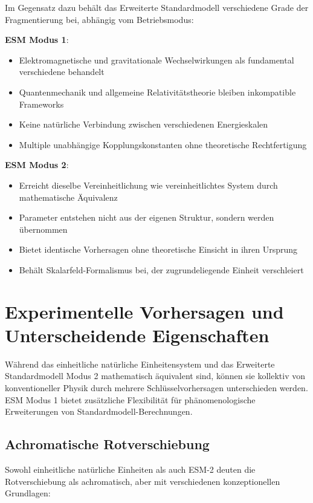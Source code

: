	Im Gegensatz dazu behält das Erweiterte Standardmodell verschiedene Grade der Fragmentierung bei, abhängig vom Betriebsmodus:
	
	\textbf{ESM Modus 1}:
	\begin{itemize}
		\item Elektromagnetische und gravitationale Wechselwirkungen als fundamental verschiedene behandelt
		\item Quantenmechanik und allgemeine Relativitätstheorie bleiben inkompatible Frameworks
		\item Keine natürliche Verbindung zwischen verschiedenen Energieskalen
		\item Multiple unabhängige Kopplungskonstanten ohne theoretische Rechtfertigung
	\end{itemize}
	
	\textbf{ESM Modus 2}:
	\begin{itemize}
		\item Erreicht dieselbe Vereinheitlichung wie vereinheitlichtes System durch mathematische Äquivalenz
		\item Parameter entstehen nicht aus der eigenen Struktur, sondern werden übernommen
		\item Bietet identische Vorhersagen ohne theoretische Einsicht in ihren Ursprung
		\item Behält Skalarfeld-Formalismus bei, der zugrundeliegende Einheit verschleiert
	\end{itemize}
	
	\section{Experimentelle Vorhersagen und Unterscheidende Eigenschaften}
	\label{sec:experimental_predictions}
	
	Während das einheitliche natürliche Einheitensystem und das Erweiterte Standardmodell Modus 2 mathematisch äquivalent sind, können sie kollektiv von konventioneller Physik durch mehrere Schlüsselvorhersagen unterschieden werden. ESM Modus 1 bietet zusätzliche Flexibilität für phänomenologische Erweiterungen von Standardmodell-Berechnungen.
	
	\subsection{Achromatische Rotverschiebung}
	\label{subsec:wavelength_dependent_redshift}
	
	Sowohl einheitliche natürliche Einheiten als auch ESM-2 deuten die Rotverschiebung als achromatisch, aber mit verschiedenen konzeptionellen Grundlagen:
	
